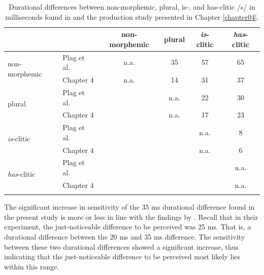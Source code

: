\begin{table}\fontsize{10}{11}
\caption{Durational differences between non-morphemic, plural, \mbox{is-,} and has-clitic /s/ in milliseconds found in \citet{Plag2017} and the production study presented in Chapter \ref{chapter04}.}
\label{tab:6.13}
\centering
\begin{tabular}{llcccc} 
\lsptoprule
\textbf{~}                           & ~           & non-morphemic & plural & \textit{is}-clitic & \textit{has}-clitic  \\ 
\midrule
\multirow{2}{*}{non-morphemic}       & Plag et al. & n.a.          & 35     & 57                 & 65                   \\
                                     & Chapter 4   & n.a.          & 14     & 31                 & 37                   \\ 
\midrule
\multirow{2}{*}{plural}              & Plag et al. & ~             & n.a.   & 22                 & 30                   \\
                                     & Chapter 4   & ~             & n.a.   & 17                 & 23                   \\ 
\midrule
\multirow{2}{*}{\textit{is}-clitic}  & Plag et al. & ~             & ~      & n.a.               & 8                    \\
                                     & Chapter 4   & ~             & ~      & n.a.               & 6                    \\ 
\midrule
\multirow{2}{*}{\textit{has}-clitic} & Plag et al. & ~             & ~      & ~                  & n.a.                 \\
                                     & Chapter 4   & ~             & ~      & ~                  & n.a.                 \\
\lspbottomrule
\end{tabular}
\end{table}

The significant increase in sensitivity of the 35 ms durational difference found in the present study is more or less in line with the findings by \citet{Klatt1975}. Recall that in their experiment, the just-noticeable difference to be perceived was 25 ms. That is, a durational difference between the 20 ms and 35 ms difference. The sensitivity between these two durational differences showed a significant increase, thus indicating that the just-noticeable difference to be perceived most likely lies within this range.

